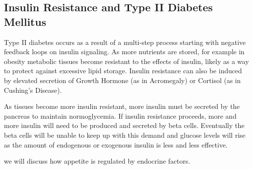 \documentclass{tufte-handout}
\begin{document}
\subsection{Insulin Resistance and Type II Diabetes Mellitus}

Type II diabetes occurs as a result of a multi-step process starting with negative feedback loops on insulin signaling.  As more nutrients are stored, for example in obesity metabolic tissues become resistant to the effects of insulin, likely as a way to protect against excessive lipid storage.  Insulin resistance can also be induced by elevated secretion of Growth Hormone (as in Acromegaly) or Cortisol (as in Cushing's Disease).

As tissues become more insulin resistant, more insulin must be secreted by the pancreas to maintain normoglycemia.  If insulin resistance proceeds, more and more insulin will need to be produced and secreted by beta cells.  Eventually the beta cells will be unable to keep up with this demand and glucose levels will rise as the amount of endogenous or exogenous insulin is less and less effective.

 we will discuss how appetite is regulated by endocrine factors.
\end{document}
